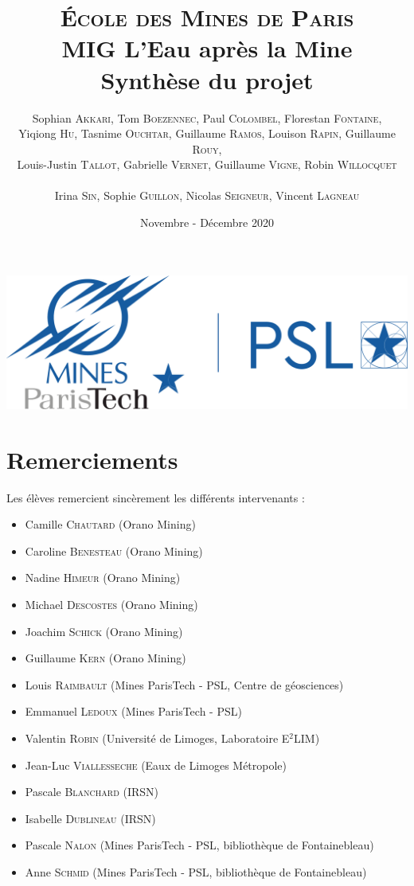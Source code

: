 \documentclass{article}
\title{ \textbf{ {\color{couleurmines}
\Huge{\textsc{École des Mines de Paris}}\\
\vspace{1 cm}
MIG L'Eau après la Mine\\\vspace{1 cm}Synthèse du projet}}
\vspace{1 cm}
}
\author{Sophian \textsc{Akkari},
Tom \textsc{Boezennec}, 
Paul \textsc{Colombel}, 
Florestan \textsc{Fontaine},\\
Yiqiong \textsc{Hu}, 
Tasnime \textsc{Ouchtar}, 
Guillaume \textsc{Ramos}, 
Louison \textsc{Rapin}, 
Guillaume \textsc{Rouy},\\ 
Louis-Justin \textsc{Tallot}, 
Gabrielle \textsc{Vernet}, 
Guillaume \textsc{Vigne}, 
Robin \textsc{Willocquet}\\
\\ Irina \textsc{Sin}, 
Sophie \textsc{Guillon}, 
Nicolas \textsc{Seigneur}, 
Vincent \textsc{Lagneau}}
\date{\vspace{2 cm}Novembre - Décembre 2020}
\begin{document}

\maketitle
\thispagestyle{empty}
\vspace{2 cm}
\begin{center}
    \includegraphics[width = 0.4\linewidth]{logoMPT.png}
\end{center}
\newpage
{}

\section*{Remerciements}
Les élèves remercient sincèrement les différents intervenants : 
\begin{itemize}
    \item Camille \textsc{Chautard} (Orano Mining)
    \item Caroline \textsc{Benesteau} (Orano Mining)
    \item Nadine \textsc{Himeur} (Orano Mining)
    \item Michael \textsc{Descostes} (Orano Mining)
    \item Joachim \textsc{Schick} (Orano Mining)
    \item Guillaume \textsc{Kern} (Orano Mining)
    \item Louis \textsc{Raimbault} (Mines ParisTech - PSL, Centre de géosciences) 
    \item  Emmanuel \textsc{Ledoux} (Mines ParisTech - PSL)
    \item Valentin \textsc{Robin} (Université de Limoges, Laboratoire E$^2$LIM) 
    \item Jean-Luc \textsc{Viallesseche} (Eaux de Limoges Métropole)
    \item Pascale \textsc{Blanchard} (IRSN)  
    \item Isabelle \textsc{Dublineau} (IRSN)    
    \item  Pascale \textsc{Nalon} (Mines ParisTech - PSL, bibliothèque de Fontainebleau)
    \item Anne \textsc{Schmid} (Mines ParisTech - PSL, bibliothèque de Fontainebleau)
\end{itemize}
\end{document}

